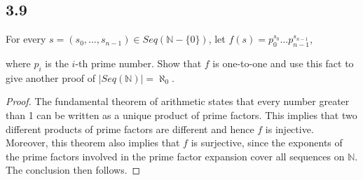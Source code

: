 \subsection*{3.9} 

For every $s = (s_0, \dots, s_{n-1}) \in Seq(\mathbb{N} - \{0\})$, let $f(s) = p_0^{s_0}\dots p_{n-1}^{s_{n-1}}$, 

where $p_i$ is the $i$-th prime number. Show that $f$ is one-to-one and use this fact to give another proof of $|Seq(\mathbb{N})|=\aleph_0$.

\begin{proof}
The fundamental theorem of arithmetic states that every number greater than 1 can be written as a unique product of prime factors. This implies that two different products of prime factors are different and hence $f$ is injective. Moreover, this theorem also implies that $f$ is surjective, since the exponents of the prime factors involved in the prime factor expansion cover all sequences on $\mathbb{N}$. The conclusion then follows.
\end{proof}



